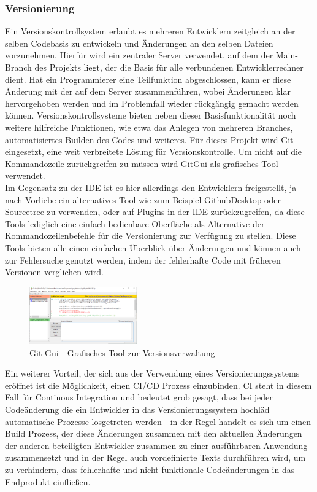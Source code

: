 \subsubsection{Versionierung}

Ein Versionskontrollsystem erlaubt es mehreren Entwicklern zeitgleich an der selben Codebasis zu entwickeln und Änderungen an den selben Dateien vorzunehmen. Hierfür wird ein zentraler Server verwendet, auf dem der Main-Branch des Projekts liegt, der die Basis für alle verbundenen Entwicklerrechner dient. Hat ein Programmierer eine Teilfunktion abgeschlossen, kann er diese Änderung mit der auf dem Server zusammenführen, wobei Änderungen klar hervorgehoben werden und im Problemfall wieder rückgängig gemacht werden können. Versionskontrollsysteme bieten neben dieser Basisfunktionalität noch weitere hilfreiche Funktionen, wie etwa das Anlegen von mehreren Branches, automatisiertes Builden des Codes und weiteres. Für dieses Projekt wird Git \cite{git}  eingesetzt, eine weit verbreitete Lösung für Versionskontrolle. Um nicht auf die Kommandozeile zurückgreifen zu müssen wird GitGui als grafisches Tool verwendet.\\

Im Gegensatz zu der IDE ist es hier allerdings den Entwicklern freigestellt, ja nach Vorliebe ein alternatives Tool wie zum Beispiel GithubDesktop oder Sourcetree zu verwenden, oder auf Plugins in der IDE zurückzugreifen, da diese Tools lediglich eine einfach bedienbare Oberfläche als Alternative der Kommandozeilenbefehle für die Versionierung zur Verfügung zu stellen. Diese Tools bieten alle einen einfachen Überblick über Änderungen und können auch zur Fehlersuche genutzt werden, indem der fehlerhafte Code mit früheren Versionen verglichen wird.\\

\begin{figure}[!h]
\centering
\includegraphics[width=4.63cm, height=2.47cm]{gitgui}
\caption{Git Gui - Grafisches Tool zur Versionsverwaltung}
\end{figure}

Ein weiterer Vorteil, der sich aus der Verwendung eines Versionierungssystems eröffnet ist die Möglichkeit, einen CI/CD Prozess einzubinden. CI steht in diesem Fall für Continous Integration und bedeutet grob gesagt, dass bei jeder Codeänderung die ein Entwickler in das Versionierungssystem hochläd automatische Prozesse losgetreten werden - in der Regel handelt es sich um einen Build Prozess, der diese Änderungen zusammen mit den aktuellen Änderungen der anderen beteiligten Entwickler zusammen zu einer ausführbaren Anwendung zusammensetzt und in der Regel auch vordefinierte Texts durchführen wird, um zu verhindern, dass fehlerhafte und nicht funktionale Codeänderungen in das Endprodukt einfließen.\\


